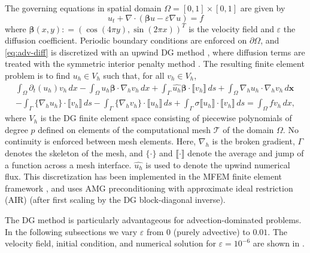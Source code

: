 \documentclass[review]{siamart}
\begin{document}
The governing equations in spatial domain $\Omega = [0,1] \times [0,1]$ are given by
\begin{equation} \label{eq:adv-diff}
	u_t + \nabla \cdot ( \bm\beta u  - \varepsilon \nabla u ) = f
\end{equation}
where $\bm\beta(x,y) : = (\cos(4\pi y), \sin(2 \pi x))^T$
is the velocity field and $\varepsilon$ the diffusion coefficient.
Periodic boundary conditions are enforced on $\partial\Omega$, and
\eqref{eq:adv-diff} is discretized with an upwind DG method \cite{Cockburn2001},
where diffusion terms are treated with the symmetric interior penalty method
\cite{Arnold1982,Arnold2002}. The resulting finite element problem is to find
$u_h \in V_h$ such that, for all $v_h \in V_h$,
\[
	\begin{multlined}
	\int_\Omega \partial_t (u_h) v_h \, dx
	- \int_\Omega u_h \bm\beta \cdot \nabla_h v_h \, dx
	+ \int_\Gamma \widehat{u_h} \bm\beta \cdot \llbracket v_h \rrbracket \, ds
	+ \int_\Omega \nabla_h u_h \cdot \nabla_h v_h \, d\bm x \\
	- \int_\Gamma \{ \nabla_h u_h \} \cdot \llbracket v_h \rrbracket \, ds
	- \int_\Gamma \{ \nabla_h v_h \} \cdot \llbracket u_h \rrbracket \, ds
	+ \int_\Gamma \sigma \llbracket u_h \rrbracket \cdot \llbracket v_h \rrbracket \, ds
	= \int_\Omega f v_h \, dx,
	\end{multlined}
\]
where $V_h$ is the DG finite element space consisting of piecewise polynomials of degree
$p$ defined on elements of the computational mesh $\mathcal{T}$ of the domain $\Omega$.
No continuity is enforced between mesh elements.
Here, $\nabla_h$ is the broken gradient, $\Gamma$ denotes the skeleton of the mesh,
and $\{ \cdot \}$ and $\llbracket \cdot \rrbracket$ denote the average and jump of a
function across a mesh interface.
$\widehat{u_h}$ is used to denote the upwind numerical flux.
This discretization has been implemented in the MFEM finite element framework
\cite{Anderson2020}, and uses AMG preconditioning with approximate ideal restriction
(AIR) \cite{Manteuffel:2019,Manteuffel:2018} (after first scaling by the DG
block-diagonal inverse).

The DG method is particularly advantageous for advection-dominated problems.
In the following subsections we vary $\varepsilon$ from $0$ (purely advective) to $0.01$.
The velocity field, initial condition, and numerical solution for $\varepsilon = 10^{-6}$
are shown in .
\end{document}
